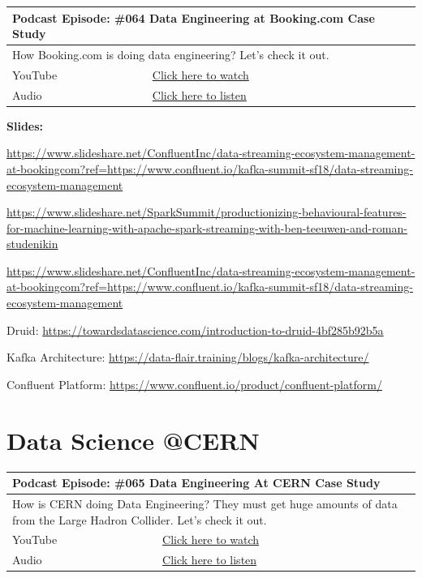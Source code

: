 \documentclass[12pt, numbers=noenddot]{scrreprt} %
\begin{document}
\begin{table}[h]
\begin{tabular}{ll}
\hline
\multicolumn{2}{l}{\textbf{Podcast Episode:} \#064 Data Engineering at Booking.com Case Study} \\ \hline
\multicolumn{2}{p{15cm}}{How Booking.com is doing data engineering? Let's check it out.}         \\ \hline
\multicolumn{1}{l|}{YouTube}   & \href{https://youtu.be/9GE3yiVo1FM}{Click here to watch}   \\
\multicolumn{1}{l|}{Audio}     & \href{https://anchor.fm/andreaskayy/episodes/064-Data-Engineering-At-Booking-com-Case-Study-e45ilg}{Click here to listen}   \\ \hline
\end{tabular}
\end{table}

\textbf{Slides:}

\url{https://www.slideshare.net/ConfluentInc/data-streaming-ecosystem-management-at-bookingcom?ref=https://www.confluent.io/kafka-summit-sf18/data-streaming-ecosystem-management}

\url{https://www.slideshare.net/SparkSummit/productionizing-behavioural-features-for-machine-learning-with-apache-spark-streaming-with-ben-teeuwen-and-roman-studenikin}

\url{https://www.slideshare.net/ConfluentInc/data-streaming-ecosystem-management-at-bookingcom?ref=https://www.confluent.io/kafka-summit-sf18/data-streaming-ecosystem-management}

Druid:
\url{https://towardsdatascience.com/introduction-to-druid-4bf285b92b5a}

Kafka Architecture:
\url{https://data-flair.training/blogs/kafka-architecture/}

Confluent Platform:
\url{https://www.confluent.io/product/confluent-platform/}


\section{Data Science @CERN}

\begin{table}[h]
\begin{tabular}{ll}
\hline
\multicolumn{2}{l}{\textbf{Podcast Episode:} \#065 Data Engineering At CERN Case Study} \\ \hline
\multicolumn{2}{p{15cm}}{How is CERN doing Data Engineering? They must get huge amounts of data from the Large Hadron Collider. Let's check it out.}         \\ \hline
\multicolumn{1}{l|}{YouTube}   & \href{https://youtu.be/LrhfzPsKaDE}{Click here to watch}   \\
\multicolumn{1}{l|}{Audio}     & \href{https://anchor.fm/andreaskayy/episodes/065-Data-Engineering-At-CERN-Case-Study-e45ime}{Click here to listen}   \\ \hline
\end{tabular}
\end{table}
\end{document}
